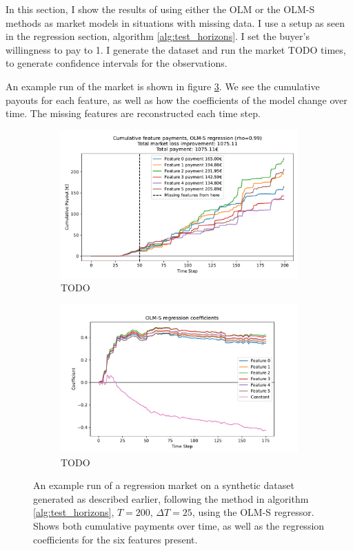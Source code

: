 In this section, I show the results of using either the OLM or the OLM-S
methods as market models in situations with missing data. I use a setup as seen
in the regression section, algorithm \ref{alg:test_horizons}. I set the buyer's
willingness to pay to 1. I generate the dataset and run the market TODO times,
to generate confidence intervals for the observations.

An example run of the market is shown in figure \ref{fig:market_example}. We
see the cumulative payouts for each feature, as well as how the coefficients of
the model change over time. The missing features are reconstructed each time step.

\begin{figure}
  \centering
  \begin{subfigure}{.4\textwidth}
    \centering
    \includegraphics[width=.9\linewidth]{Pictures/cumulative_payments.pdf}
    \caption{TODO}
    \label{fig:cumulative_payments}
  \end{subfigure}%
  \hspace{1em}
  \begin{subfigure}{.4\textwidth}
    \centering
    \includegraphics[width=.9\linewidth]{Pictures/regression_coefficients.pdf}
    \caption{TODO}
    \label{fig:regression_coefficients}
  \end{subfigure}%
  \caption{An example run of a regression market on a synthetic dataset
    generated as described earlier, following the method in algorithm
    \ref{alg:test_horizons}, $T=200$, $\Delta T=25$, using the OLM-S regressor.
    Shows both cumulative payments over time, as well as the regression
    coefficients for the six features present.}
  \label{fig:market_example}
\end{figure}

